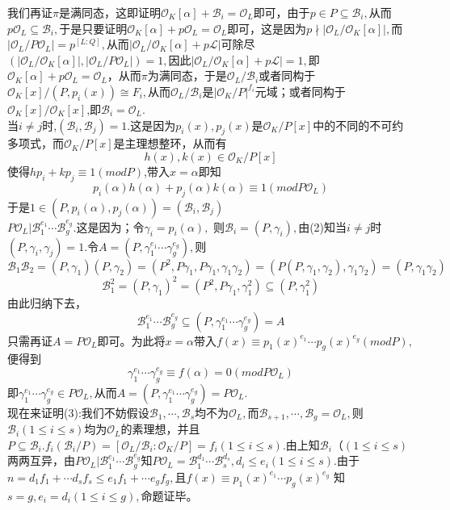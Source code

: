 \documentclass[UTF8]{article}
\begin{document}
  我们再证$\pi$是满同态，这即证明$\mathcal{O}_{K}[\alpha]+\mathcal{B}_{i}=\mathcal{O}_{L}$即可，由于$p\in P\subseteq \mathcal{B}_{i},$从而$p\mathcal{O}_{L}\subseteq \mathcal{B}_{i},$于是只要证明$\mathcal{O}_{K}[\alpha]+p\mathcal{O}_{L}=\mathcal{O}_{L}$即可，这是因为$p\nmid|\mathcal{O}_{L}/\mathcal{O}_{K}[\alpha]|,$而$|\mathcal{O}_{L}/P\mathcal{O}_{L}|=p^{[L:Q]},$从而$|\mathcal{O}_{L}/\mathcal{O}_{K}[\alpha]+p\mathcal{L}|$可除尽$(|\mathcal{O}_{L}/\mathcal{O}_{K}[\alpha]|,|\mathcal{O}_{L}/P\mathcal{O}_{L}|)=1,$因此$|\mathcal{O}_{L}/\mathcal{O}_{K}[\alpha]+p\mathcal{L}|=1,$即$\mathcal{O}_{K}[\alpha]+p\mathcal{O}_{L}=\mathcal{O}_{L}$，从而$\pi$为满同态，于是$\mathcal{O}_{L}/\mathcal{B}_{i}$或者同构于$\mathcal{O}_{K}[x]/(P,p_{i}(x))\cong F_{i},$从而$\mathcal{O}_{L}/\mathcal{B}_{i}$是$|\mathcal{O}_{K}/P|^{f_{i}}$元域；或者同构于$\mathcal{O}_{K}[x]/\mathcal{O}_{K}[x]$,即$\mathcal{B}_{i}=\mathcal{O}_{L}.$\\
  当$i\neq j$时,$(\mathcal{B}_{i},\mathcal{B}_{j})=1.$这是因为$p_{i}(x),p_{j}(x)$是$\mathcal{O}_{K}/P[x]$中的不同的不可约多项式，而$\mathcal{O}_{K}/P[x] $是主理想整环，从而有$$
  h(x),k(x)\in \mathcal{O}_{K}/P[x]
  $$
使得$hp_{i}+kp_{j}\equiv 1 (modP)$,带入$x=\alpha $即知$$
p_{i}(\alpha)h(\alpha)+p_{j}(\alpha)k(\alpha)\equiv 1(mod P\mathcal{O}_{L})
$$
于是$1\in (P,p_{i}(\alpha),p_{j}(\alpha))=(\mathcal{B}_{i},\mathcal{B}_{j})$\\
$P\mathcal{O}_{L}|\mathcal{B}_{1}^{e_{1}}\cdots \mathcal{B}_{g}^{e_{g}}.$这是因为；令$\gamma_{i}=p_{i}(\alpha),$
则$\mathcal{B}_{i}=(P,\gamma_{i}),$由(2)知当$i\neq j$时$(P,\gamma_{i},\gamma_{j})=1.$令$A=(P,\gamma_{1}^{e_{1}}\cdots\gamma_{g}^{e_{g}}),$则$$
\mathcal{B}_{1}\mathcal{B}_{2}=(P,\gamma_{1})(P,\gamma_{2})=(P^{2},P\gamma_{1},P\gamma_{1},\gamma_{1}\gamma_{2})=(P(P,\gamma_{1},\gamma_{2}),\gamma_{1}\gamma_{2})=(P,\gamma_{1}\gamma_{2})
$$
$$
\mathcal{B}_{1}^{2}=(P,\gamma_{1})^{2}=(P^{2},P\gamma_{1},\gamma_{1}^{2})\subseteq (P,\gamma_{1}^{2})
$$
由此归纳下去，
$$
\mathcal{B}_{1}^{e_{1}}\cdots \mathcal{B}_{g}^{e_{g}}\subseteq (P,\gamma_{1}^{e_{1}}\cdots\gamma_{g}^{e_{g}})=A
$$
只需再证$A=P\mathcal{O}_{L}$即可。为此将$x=\alpha $带入$f(x)\equiv p_{1}(x)^{e_{1}}\cdots p_{g}(x)^{e_{g}}(mod P),$便得到$$
\gamma_{1}^{e_{1}}\cdots\gamma_{g}^{e_{g}}\equiv f(\alpha)=0(mod P\mathcal{O}_{L})
$$
即$\gamma_{1}^{e_{1}}\cdots\gamma_{g}^{e_{g}}\in P\mathcal{O}_{L},$从而$A=(P,\gamma_{1}^{e_{1}}\cdots\gamma_{g}^{e_{g}})=P\mathcal{O}_{L}.$\\
现在来证明(3):我们不妨假设$\mathcal{B}_{1},\cdots ,\mathcal{B}_{s}$均不为$\mathcal{O}_{L},$而$\mathcal{B}_{s+1},\cdots ,\mathcal{B}_{g}=\mathcal{O}_{L},$则$\mathcal{B}_{i}(1\leq i\leq s)$均为$\mathcal{O}_{L}$的素理想，并且$P\subseteq \mathcal{B}_{i}.f_{i}(\mathcal{B}_{i}/P)=[\mathcal{O}_{L}/\mathcal{B}_{i}:\mathcal{O}_{K}/P]=f_{i}(1\leq  i\leq s).$由上知$\mathcal{B}_{i}（(1\leq i \leq s)$两两互异，由$P\mathcal{O}_{L}|\mathcal{B}_{1}^{e_{1}}\cdots \mathcal{B}_{g}^{e_{g}}$知$P\mathcal{O}_{L}=\mathcal{B}_{1}^{d_{1}}\cdots \mathcal{B}_{s}^{d_{s}},d_{i}\leq e_{i}(1\leq i\leq s).$由于$n=d_{1}f_{1}+\cdots d_{s}f_{s}\leq e_{1}f_{1}+\cdots e_{g}f_{g},$且$f(x)\equiv p_{1}(x)^{e_{1}}\cdots p_{g}(x)^{e_{g}}$
知$s=g,e_{i}=d_{i}(1\leq i\leq g),$命题证毕。
\end{document}
